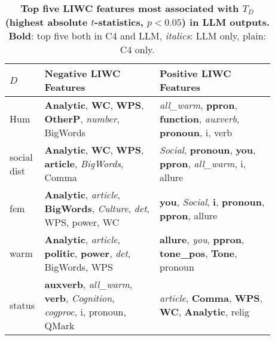 
\begin{table}[]\tiny
    \centering
    \begin{tabular}{@{}p{0.04\linewidth}|p{0.42\linewidth}|p{0.42\linewidth}@{}}
    \hline
    $D$ & \textbf{Negative LIWC Features} & \textbf{Positive LIWC Features}\\\hline%
        
Hum & \textbf{Analytic}, \textbf{WC}, \textbf{WPS}, \textbf{OtherP}, \textit{number}, BigWords &
\textit{all\_warm}, \textbf{ppron}, \textbf{function}, \textit{auxverb}, \textbf{pronoun}, i, verb
\\\hline
 social dist & \textbf{Analytic}, \textbf{WC}, \textbf{WPS}, \textbf{article}, \textit{BigWords}, Comma &\textit{Social}, \textbf{pronoun}, \textbf{you}, \textbf{ppron}, \textit{all\_warm}, i, allure\\
fem & \textbf{Analytic}, \textit{article}, \textbf{BigWords}, \textit{Culture}, \textit{det}, WPS, power, WC&\textbf{you}, \textit{Social}, \textbf{i}, \textbf{pronoun}, \textbf{ppron}, allure\\
warm & \textbf{Analytic}, \textit{article}, \textbf{politic}, \textbf{power}, \textit{det}, BigWords, WPS&\textbf{allure}, \textit{you}, \textbf{ppron}, \textbf{tone\_pos}, \textbf{Tone}, pronoun\\
status & \textbf{auxverb}, \textit{all\_warm}, \textbf{verb}, \textit{Cognition}, \textit{cogproc}, i, pronoun, QMark&\textit{article}, \textbf{Comma}, \textbf{WPS}, \textbf{WC}, \textbf{Analytic}, relig\\\hline
    \end{tabular}
    \caption{%
    \textbf{Top five LIWC features most associated with $T_D$ (highest absolute $t$-statistics, $p<0.05$) in LLM outputs.} \textbf{Bold}: top five both in C4 and LLM, \textit{italics}: LLM only, plain: C4 only.}
    \label{tab:liwc}
\end{table}
